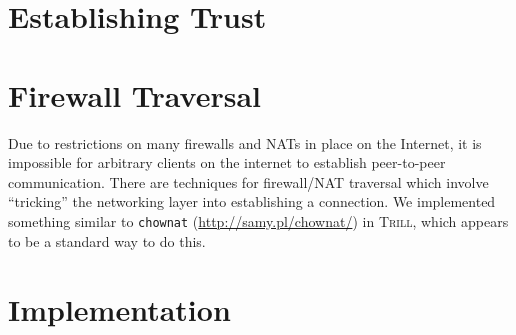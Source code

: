 \documentclass[12pt]{article}
\newcommand{\Trill}{\textsc{Trill}\xspace}
\begin{document}
\section*{Establishing Trust}


\section*{Firewall Traversal}
Due to restrictions on many firewalls and NATs in place on the Internet, it is
impossible for arbitrary clients on the internet to establish peer-to-peer
communication. There are techniques for firewall/NAT traversal which involve
``tricking'' the networking layer into establishing a connection. We implemented
something similar to \texttt{chownat} (\url{http://samy.pl/chownat/}) in \Trill,
which appears to be a standard way to do this.

\section*{Implementation}
\end{document}
